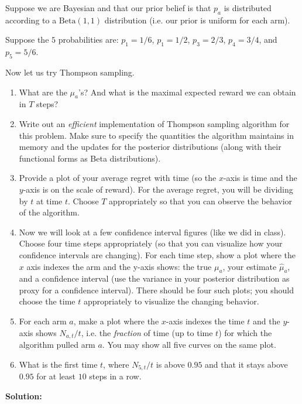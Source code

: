 \documentclass{article}
\newcommand{\solution}{\textbf{\vskip 0.2cm \large Solution:\\}}
\begin{document}
Suppose we are Bayesian and that our prior belief is that $p_a$ is distributed according to a $\textrm{Beta}(1,1)$ distribution (i.e. our prior is uniform for each arm).

Suppose the $5$ probabilities are: $p_1=1/6$, $p_1=1/2$, $p_3=2/3$, $p_4=3/4$, and $p_5=5/6$.

Now let us try Thompson sampling.

\begin{enumerate}
	\item What are the $\mu_a$'s? And what is the maximal expected reward we can obtain in $T$ steps?
	\item Write out an \emph{efficient} implementation of Thompson sampling algorithm for this problem. Make sure to specify the quantities the algorithm maintains in memory and the updates for the posterior distributions (along with their functional forms as Beta distributions).
	\item Provide a plot of your average regret with time (so the $x$-axis is time and the $y$-axis is on the scale of reward). For the average regret, you will be dividing by $t$ at time $t$. Choose $T$ appropriately so that you can observe the behavior of the algorithm.
	\item Now we will look at a few confidence interval figures (like we did in class). Choose four time steps appropriately (so that you can visualize how your confidence intervals are changing). For each time step, show a plot where the $x$ axis indexes the arm and the y-axis shows: the true $\mu_a$, your estimate $\hat \mu_a$, and a confidence interval (use the variance in your posterior distribution as proxy for a confidence interval). There should be four such plots; you should choose the time $t$ appropriately to visualize the changing behavior.
	\item For each arm $a$, make a plot where the $x$-axis indexes the time $t$ and the $y$-axis shows $N_{a,t}/t$, i.e. the \emph{fraction} of time (up to time $t$) for which the algorithm pulled arm $a$. You may show all five curves on the same plot.
	\item What is the first time $t$, where $N_{5,t}/t$ is above $0.95$ and that it stays above $0.95$ for at least $10$ steps in a row.
\end{enumerate}


\solution
\end{document}
